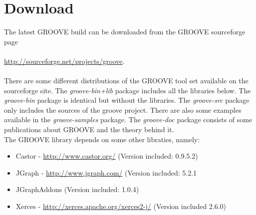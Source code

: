 \section{Download}

The latest GROOVE build can be downloaded from the GROOVE sourceforge page\\
\\
\url{http://sourceforge.net/projects/groove}.\\
\\
There are some different distributions of the GROOVE tool set available on the sourceforge site. The \emph{groove-bin+lib} package includes all the libraries below. The \emph{groove-bin} package is identical but without the libraries. The \emph{groove-src} package only includes the sources of the groove project. There are also some examples available in the \emph{groove-samples} package. The \emph{groove-doc} package consists of some publications about GROOVE and the theory behind it. 
\\
The GROOVE library depends on some other libraties, namely:

\begin{itemize}
\item Castor - \url{http://www.castor.org/} (Version included: 0.9.5.2)
\item JGraph - \url{http://www.jgraph.com/} (Version included: 5.2.1 
\item JGraphAddons (Version included: 1.0.4)
\item Xerces - \url{http://xerces.apache.org/xerces2-j/} (Version included 2.6.0)
\end{itemize}




